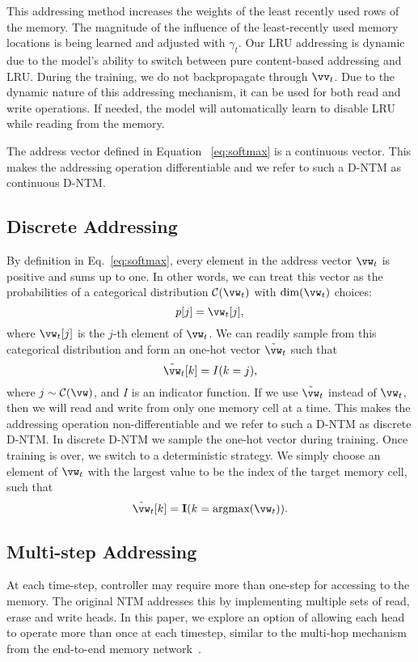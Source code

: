 \documentclass[12pt]{article}
\begin{document}
This addressing method increases the weights of the least recently used rows of the memory. The magnitude of the influence of the least-recently used memory locations is being learned and adjusted with $\gamma_t$. Our LRU addressing is dynamic due to the model's ability to switch between pure content-based addressing and LRU. During the training, we do not backpropagate through $\vv_t$. Due to the dynamic nature of this addressing mechanism, it can be used for both read and write operations. If needed, the model will automatically learn to disable LRU while reading from the memory.

The address vector defined in Equation ~\eqref{eq:softmax} is a continuous vector. This makes the addressing operation differentiable and we refer to such a D-NTM as continuous D-NTM.

\subsection{Discrete Addressing}
\label{sec:gen_disc_add_vecs}

By definition in Eq.~\eqref{eq:softmax}, every element in the address
vector $\vw_t$ is positive and sums up to one. In other words, we can treat this vector as
the probabilities of a categorical distribution $\mathcal{C}(\vw_t)$ with $\dim(\vw_t)$ choices:
\[
    p[j] = \vw_t[j],
\]
where $\vw_t[j]$ is the $j$-th element of $\vw_t$. We can readily sample from this
categorical distribution and form an one-hot vector $\tilde{\vw}_t$ such that
\[
    \tilde{\vw}_t[k] = I(k=j),
\]
where $j \sim \mathcal{C}(\vw)$, and $I$ is an indicator function. If we use $\tilde{\vw}_t$ instead of $\vw_t$, then we will read and write from only one memory cell at a time. This makes the addressing operation non-differentiable and we refer to such a D-NTM as discrete D-NTM. In discrete D-NTM we sample the one-hot vector during training. Once training is over, we switch to a deterministic strategy. We simply choose
an element of $\vw_t$ with the largest value to be the index of the target memory
cell, such that
\[
    \tilde{\vw}_t[k] = \mathbf{I}(k=\text{argmax}(\vw_t)).
\]


\subsection{Multi-step Addressing}

At each time-step, controller may require more than one-step for accessing to the memory. 
The original NTM addresses this by implementing multiple sets of read, erase and write heads.
In this paper, we explore an option of allowing each head to operate more than once at each
timestep, similar to the multi-hop mechanism from the end-to-end memory network~\citep{sukhbaatarend}. 
\end{document}
